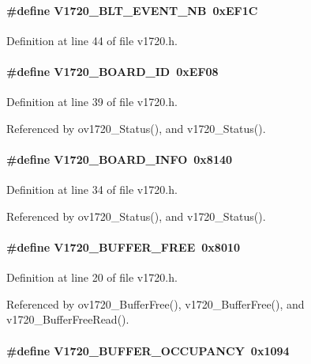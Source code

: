 \paragraph[{V1720\_\-BLT\_\-EVENT\_\-NB}]{\setlength{\rightskip}{0pt plus 5cm}\#define V1720\_\-BLT\_\-EVENT\_\-NB~0xEF1C}\hfill\label{v1720_8h_a9338d7d8ca70c86afeacdba55bbcec84}


Definition at line 44 of file v1720.h.
\paragraph[{V1720\_\-BOARD\_\-ID}]{\setlength{\rightskip}{0pt plus 5cm}\#define V1720\_\-BOARD\_\-ID~0xEF08}\hfill\label{v1720_8h_aaa74c61fb7f65d3a1c91e980515c6951}


Definition at line 39 of file v1720.h.

Referenced by ov1720\_\-Status(), and v1720\_\-Status().
\paragraph[{V1720\_\-BOARD\_\-INFO}]{\setlength{\rightskip}{0pt plus 5cm}\#define V1720\_\-BOARD\_\-INFO~0x8140}\hfill\label{v1720_8h_ad8bb225042c3d2ba39713008e0eea5bb}


Definition at line 34 of file v1720.h.

Referenced by ov1720\_\-Status(), and v1720\_\-Status().
\paragraph[{V1720\_\-BUFFER\_\-FREE}]{\setlength{\rightskip}{0pt plus 5cm}\#define V1720\_\-BUFFER\_\-FREE~0x8010}\hfill\label{v1720_8h_a937c80cdb8c2e07ff6b107cc602341de}


Definition at line 20 of file v1720.h.

Referenced by ov1720\_\-BufferFree(), v1720\_\-BufferFree(), and v1720\_\-BufferFreeRead().
\paragraph[{V1720\_\-BUFFER\_\-OCCUPANCY}]{\setlength{\rightskip}{0pt plus 5cm}\#define V1720\_\-BUFFER\_\-OCCUPANCY~0x1094}\hfill\label{v1720_8h_a8808def743e80901602fe463e8045f98}


